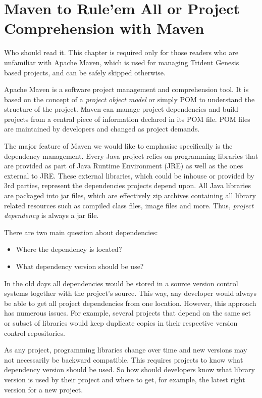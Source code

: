 \chapter{Maven to Rule'em All or Project Comprehension with Maven}\label{ch00:01}

  \begin{notebox}{Who should read it.}{\label{mb:skip}}
    This chapter is required only for those readers who are unfamiliar with Apache Maven, which is used for managing Trident Genesis based projects, and can be safely skipped otherwise.
  \end{notebox}
  
  Apache Maven is a software project management and comprehension tool. 
  It is based on the concept of a \emph{project object model} or simply POM to understand the structure of the project. 
  Maven can manage project dependencies and build projects from a central piece of information declared in its POM file.
  POM files are maintained by developers and changed as project demands.

  The major feature of Maven we would like to emphasise specifically is the dependency management.
  Every Java project relies on programming libraries that are provided as part of Java Runtime Environment (JRE) as well as the ones external to JRE.
  These external libraries, which could be inhouse or provided by 3rd parties, represent the dependencies projects depend upon.
  All Java libraries are packaged into jar files, which are effectively zip archives containing all library related resources such as compiled class files, image files and more.
  Thus, \emph{project dependency} is always a jar file.

  There are two main question about dependencies: 
  \begin{itemize}
    \item Where the dependency is located?
    \item What dependency version should be use?
  \end{itemize}

  In the old days all dependencies would be stored in a source version control systems together with the project's source.
  This way, any developer would always be able to get all project dependencies from one location.
  However, this approach has numerous issues.
  For example, several projects that depend on the same set or subset of libraries would keep duplicate copies in their respective version control repositories.

  As any project, programming libraries change over time and new versions may not necessarily be backward compatible.
  This requires projects to know what dependency version should be used.
  So how should developers know what library version is used by their project and where to get, for example, the latest right version for a new project.

